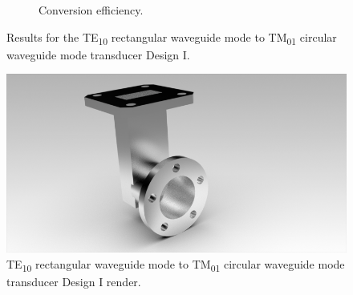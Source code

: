 \documentclass[english,twoside]{article}
\begin{document}
\begin{figure}[H]
\begin{subfigure}[b]{0.48\textwidth}
				\caption{Conversion efficiency.}
			\end{subfigure}
			\caption{Results for the TE\textsubscript{10} rectangular waveguide mode to TM\textsubscript{01} circular waveguide mode transducer Design I.}
			\label{fig:wrToWcTM01_irises}
		\end{figure}
	
		\begin{figure}[H]
			\centering
			\includegraphics[width=.7\textwidth]{renders/wrToWcTM01_irises}
			\caption{TE\textsubscript{10} rectangular waveguide mode to TM\textsubscript{01} circular waveguide mode transducer Design I render.}
		\end{figure}
		
\end{document}
